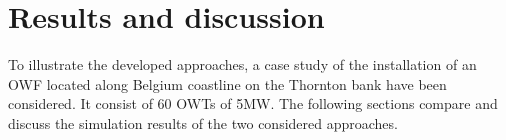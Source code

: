 \section{Results and discussion}
\label{results}
To illustrate the developed approaches, a case study of the installation of an OWF located along Belgium coastline on the Thornton bank have been considered. It consist of 60 OWTs of 5MW. The following sections compare and discuss the simulation results of the two considered approaches.